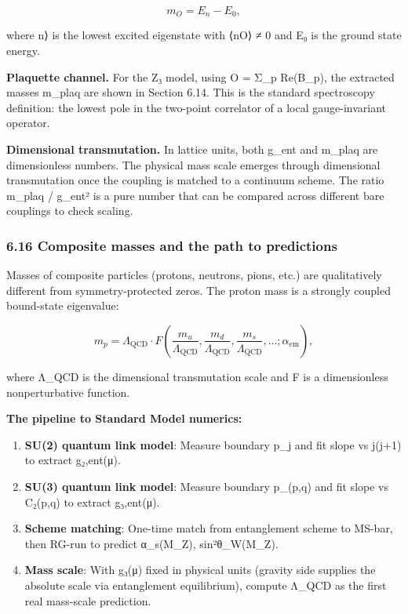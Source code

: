 \documentclass[
]{article}
\begin{document}
\[
m_O = E_n - E_0,
\]

where \textbar n⟩ is the lowest excited eigenstate with
⟨n\textbar O⟩ ≠ 0 and E₀ is the ground state energy.

\textbf{Plaquette channel.} For the Z₃ model, using O = Σ\_p Re(B\_p),
the extracted masses m\_plaq are shown in Section 6.14. This is the
standard spectroscopy definition: the lowest pole in the two-point
correlator of a local gauge-invariant operator.

\textbf{Dimensional transmutation.} In lattice units, both g\_ent and
m\_plaq are dimensionless numbers. The physical mass scale emerges
through dimensional transmutation once the coupling is matched to a
continuum scheme. The ratio m\_plaq / g\_ent² is a pure number that can
be compared across different bare couplings to check scaling.

\subsubsection{6.16 Composite masses and the path to
predictions}\label{composite-masses-and-the-path-to-predictions}

Masses of composite particles (protons, neutrons, pions, etc.) are
qualitatively different from symmetry-protected zeros. The proton mass
is a strongly coupled bound-state eigenvalue:

\[
m_p = \Lambda_{\mathrm{QCD}} \cdot F\left(\frac{m_u}{\Lambda_{\mathrm{QCD}}},
\frac{m_d}{\Lambda_{\mathrm{QCD}}}, \frac{m_s}{\Lambda_{\mathrm{QCD}}}, \ldots;
\alpha_{\mathrm{em}}\right),
\]

where Λ\_QCD is the dimensional transmutation scale and F is a
dimensionless nonperturbative function.

\textbf{The pipeline to Standard Model numerics:}

\begin{enumerate}
\def\labelenumi{\arabic{enumi}.}
\item
  \textbf{SU(2) quantum link model}: Measure boundary p\_j and fit slope
  vs j(j+1) to extract g₂,ent(μ).
\item
  \textbf{SU(3) quantum link model}: Measure boundary p\_(p,q) and fit
  slope vs C₂(p,q) to extract g₃,ent(μ).
\item
  \textbf{Scheme matching}: One-time match from entanglement scheme to
  MS-bar, then RG-run to predict α\_s(M\_Z), sin²θ\_W(M\_Z).
\item
  \textbf{Mass scale}: With g₃(μ) fixed in physical units (gravity side
  supplies the absolute scale via entanglement equilibrium), compute
  Λ\_QCD as the first real mass-scale prediction.
\end{enumerate}
\end{document}
